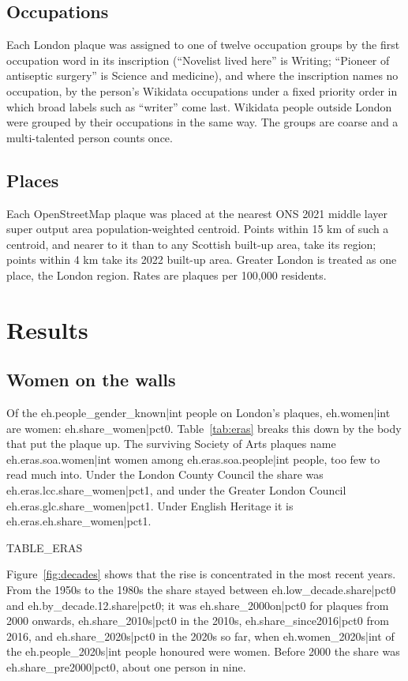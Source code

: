 \documentclass[11pt,a4paper]{article}
\begin{document}
\subsection{Occupations}

Each London plaque was assigned to one of twelve occupation groups by the first occupation word in its inscription (``Novelist lived here'' is Writing; ``Pioneer of antiseptic surgery'' is Science and medicine), and where the inscription names no occupation, by the person's Wikidata occupations under a fixed priority order in which broad labels such as ``writer'' come last. Wikidata people outside London were grouped by their occupations in the same way. The groups are coarse and a multi-talented person counts once.

\subsection{Places}

Each OpenStreetMap plaque was placed at the nearest ONS 2021 middle layer super output area population-weighted centroid. Points within 15 km of such a centroid, and nearer to it than to any Scottish built-up area, take its region; points within 4 km take its 2022 built-up area. Greater London is treated as one place, the London region. Rates are plaques per 100,000 residents.

\section{Results}

\subsection{Women on the walls}

Of the {{eh.people_gender_known|int}} people on London's plaques, {{eh.women|int}} are women: {{eh.share_women|pct0}}. Table~\ref{tab:eras} breaks this down by the body that put the plaque up. The surviving Society of Arts plaques name {{eh.eras.soa.women|int}} women among {{eh.eras.soa.people|int}} people, too few to read much into. Under the London County Council the share was {{eh.eras.lcc.share_women|pct1}}, and under the Greater London Council {{eh.eras.glc.share_women|pct1}}. Under English Heritage it is {{eh.eras.eh.share_women|pct1}}.

{{TABLE_ERAS}}

Figure~\ref{fig:decades} shows that the rise is concentrated in the most recent years. From the 1950s to the 1980s the share stayed between {{eh.low_decade.share|pct0}} and {{eh.by_decade.12.share|pct0}}; it was {{eh.share_2000on|pct0}} for plaques from 2000 onwards, {{eh.share_2010s|pct0}} in the 2010s, {{eh.share_since2016|pct0}} from 2016, and {{eh.share_2020s|pct0}} in the 2020s so far, when {{eh.women_2020s|int}} of the {{eh.people_2020s|int}} people honoured were women. Before 2000 the share was {{eh.share_pre2000|pct0}}, about one person in nine.
\end{document}
